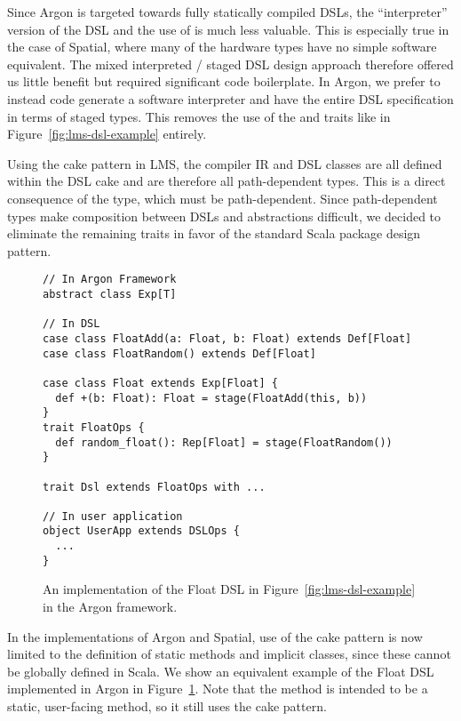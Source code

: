 Since Argon is targeted towards fully statically compiled DSLs,
the ``interpreter'' version of the DSL and the use of  is much less valuable.
This is especially true in the case of Spatial, where many of the hardware types
have no simple software equivalent. The mixed interpreted / staged DSL
design approach therefore offered us little benefit but required significant code boilerplate.
In Argon, we prefer to instead code generate a software interpreter and have the
entire DSL specification in terms of staged types. This removes the use of the
 and  traits like in Figure~\ref{fig:lms-dsl-example} entirely.

Using the cake pattern in LMS, the compiler IR and DSL classes
are all defined within the DSL cake and are therefore all path-dependent types.
This is a direct consequence of the 
type, which must be path-dependent.
Since path-dependent types make composition between DSLs and abstractions difficult,
we decided to eliminate the remaining  traits in favor of
the standard Scala package design pattern.

\begin{figure}
\begin{lstlisting}[language=ScalaDSL]
// In Argon Framework
abstract class Exp[T]

// In DSL
case class FloatAdd(a: Float, b: Float) extends Def[Float]
case class FloatRandom() extends Def[Float]

case class Float extends Exp[Float] {
  def +(b: Float): Float = stage(FloatAdd(this, b))
}
trait FloatOps {
  def random_float(): Rep[Float] = stage(FloatRandom())
}

trait Dsl extends FloatOps with ...

// In user application
object UserApp extends DSLOps {
  ...
}
\end{lstlisting}
\caption{An implementation of the Float DSL in Figure~\ref{fig:lms-dsl-example} in
the Argon framework.}
\label{fig:argon-dsl-example}
\end{figure}

In the implementations of Argon and Spatial, use of the cake pattern is
now limited to the definition of static methods and implicit classes,
since these cannot be globally defined in Scala. We show an equivalent
example of the Float DSL implemented in Argon in Figure~\ref{fig:argon-dsl-example}.
Note that the  method is intended to be a static, user-facing method,
so it still uses the cake pattern.

